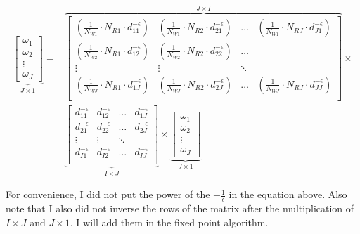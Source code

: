 \documentclass[
  11pt]{article}
\begin{document}
\begin{align*}
  \underbrace{
  \begin{bmatrix}
    \omega_1 \\
    \omega_2 \\
    \vdots \\
    \omega_J
  \end{bmatrix}}_{J \times 1}
  = &
  \overbrace{
  \begin{bmatrix}
    \left(\frac{1}{N_{W1}} \cdot N_{R1} \cdot d_{11}^{-\epsilon}\right) & \left(\frac{1}{N_{W1}} \cdot N_{R2} \cdot d_{21}^{-\epsilon}\right) & \ldots & \left(\frac{1}{N_{W1}} \cdot N_{RJ} \cdot d_{J1}^{-\epsilon}\right) \\
    \left(\frac{1}{N_{W2}} \cdot N_{R1} \cdot d_{12}^{-\epsilon}\right) & \left(\frac{1}{N_{W2}} \cdot N_{R2} \cdot d_{22}^{-\epsilon}\right) & \ldots \\
    \vdots & \vdots & \ddots \\
    \left(\frac{1}{N_{WJ}} \cdot N_{R1} \cdot d_{1J}^{-\epsilon}\right) & \left(\frac{1}{N_{WJ}} \cdot N_{R2} \cdot d_{2J}^{-\epsilon}\right) & \ldots & \left(\frac{1}{N_{WJ}} \cdot N_{RJ} \cdot d_{JJ}^{-\epsilon}\right) \\
  \end{bmatrix}}^{J \times I} \times \\ 
  &\underbrace{
  \begin{bmatrix}
    d_{11}^{-\epsilon} & d_{12}^{-\epsilon} & \ldots & d_{1J}^{-\epsilon} \\
    d_{21}^{-\epsilon} & d_{22}^{-\epsilon} & \ldots & d_{2J}^{-\epsilon} \\
    \vdots & \vdots & \ddots \\
    d_{I1}^{-\epsilon} & d_{I2}^{-\epsilon} & \ldots & d_{IJ}^{-\epsilon} \\
  \end{bmatrix}}_{I \times J} \times 
  \underbrace{
  \begin{bmatrix}
    \omega_1 \\
    \omega_2 \\
    \vdots \\
    \omega_J
  \end{bmatrix}}_{J \times 1}
\end{align*}

For convenience, I did not put the power of the \(-\frac{1}{\epsilon}\)
in the equation above. Also note that I also did not inverse the rows of
the matrix after the multiplication of \(I \times J\) and
\(J \times 1\). I will add them in the fixed point algorithm.
\end{document}
